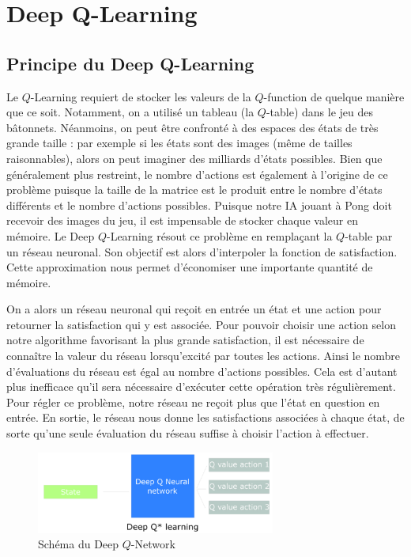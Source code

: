 \section{Deep Q-Learning}

\subsection{Principe du Deep Q-Learning}

Le $Q$-Learning requiert de stocker les valeurs de la $Q$-function de quelque manière que ce soit. Notamment, on a utilisé un tableau (la $Q$-table) dans le jeu des
bâtonnets. Néanmoins, on peut être confronté à des espaces des états de très grande taille : par exemple si les états sont des images (même de tailles raisonnables), 
alors on peut imaginer des milliards d'états possibles. Bien que généralement plus restreint, le nombre d'actions est également à l'origine de ce problème puisque la
taille de la matrice est le produit entre le nombre d'états différents et le nombre d'actions possibles. Puisque notre IA jouant à Pong doit recevoir des images du jeu,
il est impensable de stocker chaque valeur en mémoire. Le Deep $Q$-Learning résout ce problème en remplaçant la $Q$-table par un réseau neuronal. Son objectif est alors 
d'interpoler la fonction de satisfaction. Cette approximation nous permet d'économiser une importante quantité de mémoire.

On a alors un réseau neuronal qui reçoit en entrée un état et une action pour retourner la satisfaction qui y est associée. Pour pouvoir choisir une action selon
notre algorithme favorisant la plus grande satisfaction, il est nécessaire de connaître la valeur du réseau lorsqu'excité par toutes les actions. Ainsi
le nombre d'évaluations du réseau est égal au nombre d'actions possibles. Cela est d'autant plus inefficace qu'il sera nécessaire d'exécuter cette opération très
régulièrement. Pour régler ce problème, notre réseau ne reçoit plus que l'état en question en entrée. En sortie, le réseau nous donne les satisfactions associées à chaque 
état, de sorte qu'une seule évaluation du réseau suffise à choisir l'action à effectuer.

\begin{figure}[h]
 \centering
 \includegraphics[width=0.7\textwidth]{img/schema_dql.png}
 \caption{Schéma du Deep $Q$-Network}
\end{figure}


